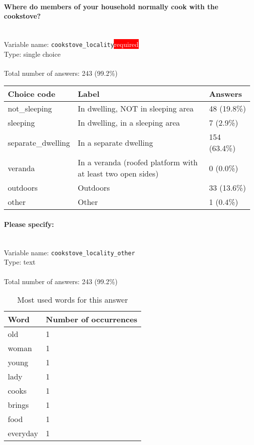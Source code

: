 \documentclass[11.5pt, a4paper]{scrartcl}
\begin{document}
\paragraph{Where do members of your household normally cook with the cookstove? }
\  \\Variable name: \texttt{cookstove\_locality}\hfill\colorbox{red}{\small{\textcolor{white}{required}}}\\
 Type: single choice\\
\\Total number of answers: 243 (99.2\%)
\\[0.2em] \begin{tabular}{p{4cm}|p{8cm}|p{3cm}}
Choice code & Label & Answers \\
\hline
not\_sleeping & In dwelling, NOT in sleeping area& \cellcolor{color0}48 (19.8\%)\\
\cellcolor{mygray} sleeping & \cellcolor{mygray}In dwelling, in a sleeping area & \cellcolor{color0}7 (2.9\%)\\
separate\_dwelling & In a separate dwelling& \cellcolor{color3}154 (63.4\%)\\
\cellcolor{mygray} veranda & \cellcolor{mygray}In a veranda (roofed platform with at least two open sides)  & \cellcolor{color0}0 (0.0\%)\\
outdoors & Outdoors& \cellcolor{color0}33 (13.6\%)\\
\cellcolor{mygray} other & \cellcolor{mygray}Other & \cellcolor{color0}1 (0.4\%)\\
\end{tabular}
\paragraph{Please specify:}
\  \\Variable name: \texttt{cookstove\_locality\_other}\\
Type: text\\
\\Total number of answers: 243 (99.2\%)
\\[0.2em]\begin{table}[H]
 \begin{tabular}{p{4cm}|p{8cm}}
Word & Number of occurrences  \\
\hline
\cellcolor{mygray}old&\cellcolor{mygray}1\\
\hline
woman&1\\
\hline
\cellcolor{mygray}young&\cellcolor{mygray}1\\
\hline
lady&1\\
\hline
\cellcolor{mygray}cooks&\cellcolor{mygray}1\\
\hline
brings&1\\
\hline
\cellcolor{mygray}food&\cellcolor{mygray}1\\
\hline
everyday&1\\
\hline
\end{tabular}
\caption{\label{tab:table-name} Most used words for this answer}
\end{table}
\end{document}
